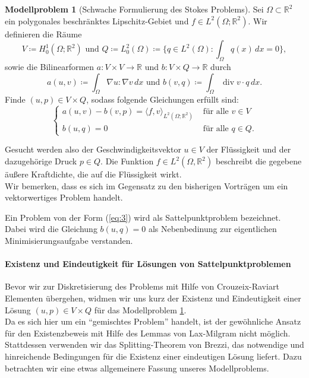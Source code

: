 \documentclass[a4paper]{scrartcl}
\newcommand{\real}{\mathbb{R}}
\newcommand{\Hzero}{H_0^1}
\newcommand{\Ltwo}{L^2}
\newcommand{\dx}{\,dx}
\DeclareMathOperator{\divOp}{div}
\theoremstyle{plain}
\theoremstyle{definition}
\newtheorem{modellproblem}{Modellproblem}
\theoremstyle{remark}
\begin{document}
\begin{modellproblem}[Schwache Formulierung des Stokes Problems] \label{problem:1}
  Sei \(\Omega \subset \real^2\) ein polygonales beschränktes
  Lipschitz-Gebiet und \(f\in \Ltwo(\Omega; \real^2)\). Wir definieren
  die Räume 
  \[V \coloneqq \Hzero(\Omega; \real^2) \text{ und } Q \coloneqq
  \Ltwo_0(\Omega) \coloneqq \{q \in \Ltwo(\Omega): \int_\Omega q(x)
  \dx = 0\},\]
  sowie die Bilinearformen \(a \colon V\times V \rightarrow \real\)
  und \(b \colon V\times Q \rightarrow \real\) durch
  \begin{equation}
    \label{eq:2}
    a(u,v) \coloneqq \int_\Omega \nabla u : \nabla v \dx 
    \text{ und }
    b(v,q) \coloneqq \int_\Omega \divOp v \cdot q \dx. 
  \end{equation}
  Finde \((u,p) \in V\times Q\), sodass folgende Gleichungen erfüllt
  sind: 
  \begin{equation}
    \label{eq:3}
    \begin{cases}
      a(u,v) - b(v,p) = \langle f, v \rangle_{\Ltwo(\Omega;\real^2)} &
      \text{ für alle } v \in V \\
      b(u,q) = 0 & \text{ für alle } q \in Q.
    \end{cases}
  \end{equation}
\end{modellproblem}

{\color{blue}
  \noindent Gesucht werden also der Geschwindigkeitsvektor \(u \in V\) der
  Flüssigkeit und der dazugehörige Druck \(p \in Q\). Die Funktion \(f
  \in \Ltwo(\Omega, \real^2)\) beschreibt die gegebene äußere
  Kraftdichte, die auf die Flüssigkeit wirkt. \\
  Wir bemerken, dass es sich im Gegensatz zu den bisherigen Vorträgen um
  ein vektorwertiges Problem handelt. \\
}

\noindent Ein Problem von der Form (\ref{eq:3}) wird als Sattelpunktproblem
bezeichnet. Dabei wird die Gleichung \(b(u,q) = 0 \) als Nebenbedinung
zur eigentlichen Minimi\-sierungs\-aufgabe verstanden. \\ 

\paragraph{Existenz und Eindeutigkeit für Lösungen von Sattelpunktproblemen}
\label{sec:exist-und-eind}

\noindent Bevor wir zur Diskretisierung des Problems mit Hilfe von
Crouzeix-Raviart Elementen übergehen, widmen wir uns kurz der Existenz
und Eindeutigkeit einer Lösung \((u,p) \in V\times Q\) für das Modellproblem
\ref{problem:1}.\\
Da es sich hier um ein ``gemischtes Problem'' handelt, ist der
gewöhnliche Ansatz für den Existenzbeweis mit Hilfe des Lemmas von
Lax-Milgram nicht möglich. Stattdessen verwenden wir das
Splitting-Theorem von Brezzi, das notwendige und hinreichende
Bedingungen für die Existenz einer eindeutigen Lösung liefert. Dazu
betrachten wir eine etwas allgemeinere Fassung unseres Modellproblems.
\end{document}
